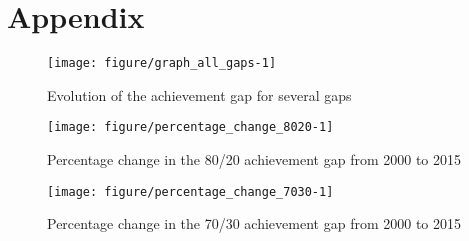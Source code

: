 \documentclass[11pt, a4paper]{article}\usepackage[]{graphicx}\usepackage[]{color}
\begin{document}


\pagebreak

\section{Appendix}

\begin{figure}

{\centering \texttt{[image: figure/graph\_all\_gaps-1]} 

}

\caption[Evolution of the achievement gap for several gaps]{Evolution of the achievement gap for several gaps}\label{fig:graph_all_gaps}
\end{figure}



\begin{figure}

{\centering \texttt{[image: figure/percentage\_change\_8020-1]} 

}

\caption[Percentage change in the 80/20 achievement gap from 2000 to 2015]{Percentage change in the 80/20 achievement gap from 2000 to 2015}\label{fig:percentage_change_8020}
\end{figure}



\begin{figure}

{\centering \texttt{[image: figure/percentage\_change\_7030-1]} 

}

\caption[Percentage change in the 70/30 achievement gap from 2000 to 2015]{Percentage change in the 70/30 achievement gap from 2000 to 2015}\label{fig:percentage_change_7030}
\end{figure}
\end{document}
